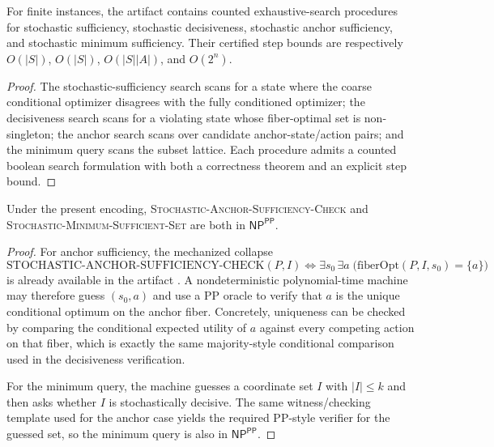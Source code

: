\begin{proposition}\label{prop:stochastic-explicit-search}
For finite instances, the artifact contains counted exhaustive-search procedures for stochastic sufficiency, stochastic decisiveness, stochastic anchor sufficiency, and stochastic minimum sufficiency. Their certified step bounds are respectively $O(|S|)$, $O(|S|)$, $O(|S||A|)$, and $O(2^n)$.
\end{proposition}


\begin{proof}
The stochastic-sufficiency search scans for a state where the coarse conditional optimizer disagrees with the fully conditioned optimizer; the decisiveness search scans for a violating state whose fiber-optimal set is non-singleton; the anchor search scans over candidate anchor-state/action pairs; and the minimum query scans the subset lattice. Each procedure admits a counted boolean search formulation with both a correctness theorem and an explicit step bound.
\end{proof}

\begin{theorem}\label{thm:stochastic-nppp-upper}
Under the present encoding, \textsc{Stochastic-Anchor-Sufficiency-Check} and \textsc{Stochastic-Minimum-Sufficient-Set} are both in $\textsf{NP}^{\textsf{PP}}$.
\end{theorem}


\begin{proof}
For anchor sufficiency, the mechanized collapse
\[
\mathrm{STOCHASTIC\mbox{-}ANCHOR\mbox{-}SUFFICIENCY\mbox{-}CHECK}(P,I)
\iff
\exists s_0\,\exists a\; \bigl(\mathrm{fiberOpt}(P,I,s_0)=\{a\}\bigr)
\]
is already available in the artifact . A nondeterministic polynomial-time machine may therefore guess $(s_0,a)$ and use a PP oracle to verify that $a$ is the unique conditional optimum on the anchor fiber. Concretely, uniqueness can be checked by comparing the conditional expected utility of $a$ against every competing action on that fiber, which is exactly the same majority-style conditional comparison used in the decisiveness verification.

For the minimum query, the machine guesses a coordinate set $I$ with $|I|\le k$ and then asks whether $I$ is stochastically decisive. The same witness/checking template used for the anchor case yields the required PP-style verifier for the guessed set, so the minimum query is also in $\textsf{NP}^{\textsf{PP}}$.
\end{proof}

